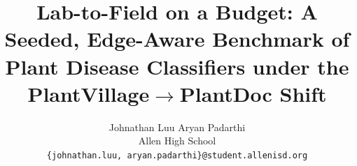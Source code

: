 \documentclass[10pt,twocolumn,letterpaper]{article}
\title{Lab-to-Field on a Budget: A Seeded, Edge-Aware Benchmark of\\Plant Disease Classifiers under the PlantVillage$\rightarrow$PlantDoc Shift}
\author{Johnathan Luu \qquad Aryan Padarthi\\
Allen High School\\
{\tt\small \{johnathan.luu, aryan.padarthi\}@student.allenisd.org}
}
\begin{document}
\maketitle









{
    \small
    
    
}
\end{document}
